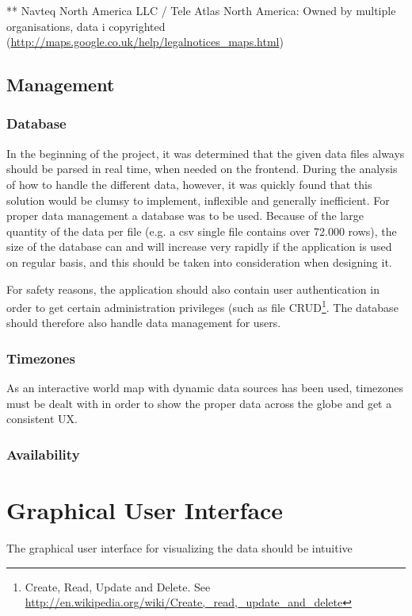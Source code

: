 ** Navteq North America LLC / Tele Atlas North America: Owned by multiple organisations, data i copyrighted (\url{http://maps.google.co.uk/help/legalnotices_maps.html})

\subsection{Management}

\subsubsection{Database}
In the beginning of the project, it was determined that the given data files always should be parsed in real time, when needed on the frontend. During the analysis of how to handle the different data, however, it was quickly found that this solution would be clumsy to implement, inflexible and generally inefficient.
For proper data management a database was to be used. Because of the large quantity of the data per file (e.g. a csv single file contains over 72.000 rows), the size of the database can and will increase very rapidly if the application is used on regular basis, and this should be taken into consideration when designing it.

For safety reasons, the application should also contain user authentication in order to get certain administration privileges (such as file CRUD\footnote{Create, Read, Update and Delete. See \url{http://en.wikipedia.org/wiki/Create,_read,_update_and_delete}}. The database should therefore also handle data management for users.

\subsubsection{Timezones}
As an interactive world map with dynamic data sources has been used, timezones must be dealt with in order to show the proper data across the globe and get a consistent UX.

\subsubsection{Availability}

\section{Graphical User Interface}
The graphical user interface for visualizing the data should be intuitive
